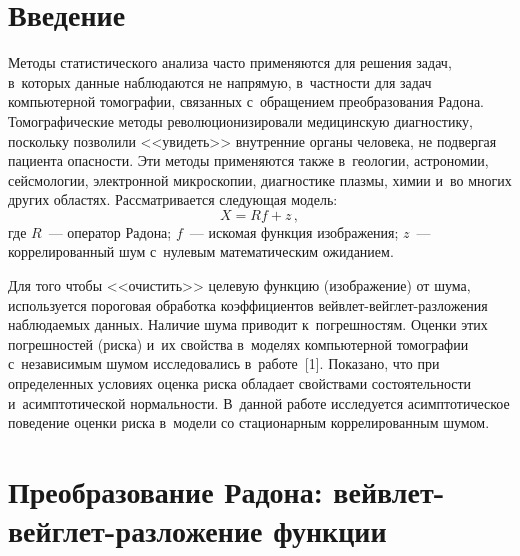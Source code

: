 
\vspace*{-6pt}




\thispagestyle{headings}

\begin{multicols}{2}

\label{st\stat}

\section{Введение}

Методы статистического анализа часто применяются для решения задач,
в~которых данные наблюдаются не напрямую, в~частности для
задач компьютерной томографии, связанных с~обращением преобразования Радона.
Томографические методы революционизировали медицинскую диагностику,
поскольку позволили
<<увидеть>> внутренние органы человека, не подвергая пациента опасности.
Эти методы применяются также в~геологии, астрономии, сейсмологии, электронной
микроскопии, диагностике плазмы, химии и~во многих других областях.
Рассматривается следующая модель:
\begin{equation*}
X = R f + z\,,
\end{equation*}
где $R$~--- оператор Радона; $f$~--- искомая функция изображения; $z$~---
коррелированный шум с~нулевым математическим ожиданием.

Для того чтобы <<очистить>> целевую функцию (изображение) от шума,
используется пороговая обработка коэффициентов вейв\-лет-вейг\-лет-раз\-ло\-же\-ния
наблюдаемых данных. Наличие шума приводит к~погрешностям. Оценки этих погрешностей
(риска) и~их свойства в~моделях компьютерной томографии с~независимым шумом
исследовались в~работе~[1]. Показано, что при определенных условиях оценка
риска обладает свойствами состоятельности и~асимптотической нормальности.
В~данной работе исследуется асимптотическое поведение оценки риска в~модели
со стационарным коррелированным шумом.

\section{Преобразование Радона: вейвлет-вейглет-разложение функции}


\end{multicols}

